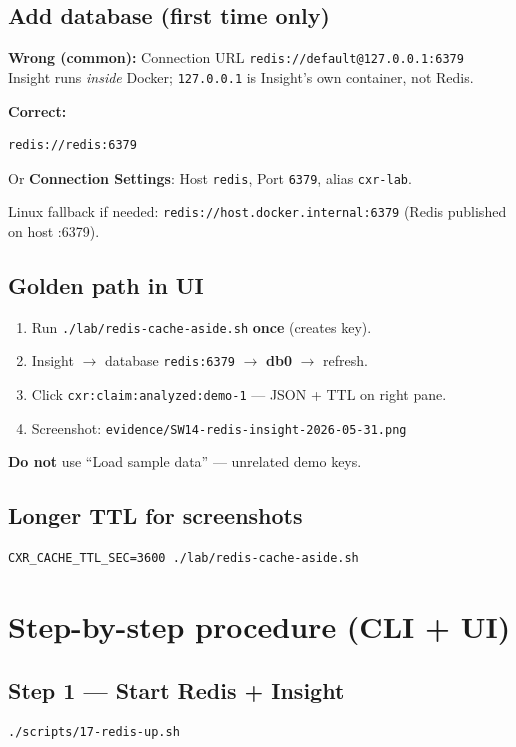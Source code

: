 \documentclass[11pt,a4paper]{report}
\begin{document}
\section{Add database (first time only)}

\textbf{Wrong (common):} Connection URL \texttt{redis://default@127.0.0.1:6379}\\
Insight runs \emph{inside} Docker; \texttt{127.0.0.1} is Insight's own container, not Redis.

\textbf{Correct:}
\begin{lstlisting}[style=bash]
redis://redis:6379
\end{lstlisting}
Or \textbf{Connection Settings}: Host \texttt{redis}, Port \texttt{6379}, alias \texttt{cxr-lab}.

Linux fallback if needed: \texttt{redis://host.docker.internal:6379} (Redis published on host :6379).

\section{Golden path in UI}

\begin{enumerate}
  \item Run \texttt{./lab/redis-cache-aside.sh} \textbf{once} (creates key).
  \item Insight $\rightarrow$ database \texttt{redis:6379} $\rightarrow$ \textbf{db0} $\rightarrow$ refresh.
  \item Click \texttt{cxr:claim:analyzed:demo-1} --- JSON + TTL on right pane.
  \item Screenshot: \texttt{evidence/SW14-redis-insight-2026-05-31.png}
\end{enumerate}

\textbf{Do not} use ``Load sample data'' --- unrelated demo keys.

\section{Longer TTL for screenshots}
\begin{lstlisting}[style=bash]
CXR_CACHE_TTL_SEC=3600 ./lab/redis-cache-aside.sh
\end{lstlisting}

\chapter{Step-by-step procedure (CLI + UI)}

\section{Step 1 --- Start Redis + Insight}
\begin{lstlisting}[style=bash]
./scripts/17-redis-up.sh
\end{lstlisting}
\end{document}
